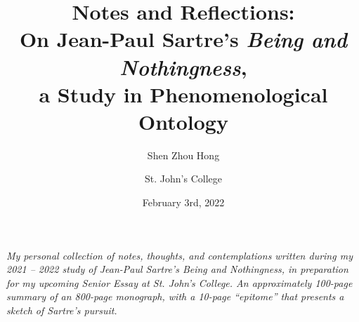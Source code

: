 \documentclass[
  10pt,       %
  a4paper,    %
  final,      %
  onecolumn,  %
  twoside,    %
  notitlepage, %
]{book}
\title{
  \textbf{Notes and Reflections:} \\
  On Jean-Paul Sartre's \emph{Being and Nothingness},\\
  a Study in Phenomenological Ontology
}
\author{
  Shen Zhou Hong \and St. John's College
}
\date{February 3rd, 2022}
\begin{document}

\pagestyle{plain}
\maketitle

\vfill

\noindent
\emph{My personal collection of notes, thoughts, and contemplations written during my 2021 -- 2022 study of Jean-Paul Sartre's \emph{Being and Nothingness}, in preparation for my upcoming Senior Essay at St. John's College. An approximately 100-page summary of an 800-page monograph, with a 10-page \enquote{epitome} that presents a sketch of Sartre's pursuit.}

\vspace{2cm}

\tableofcontents %

% 

\pagestyle{fancy}



\end{document}
